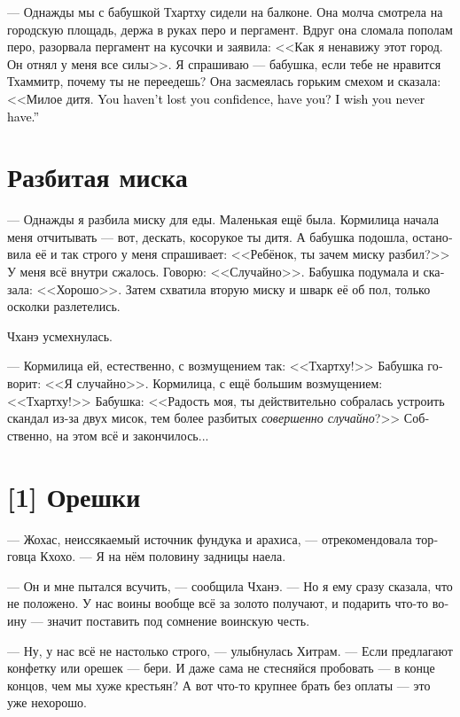 \documentclass[a4paper,12pt,fleqn]{book}\usepackage{cooltooltips}\usepackage{polyglossia}\setdefaultlanguage[babelshorthands=true]{russian}\setotherlanguage{english}\defaultfontfeatures{Ligatures=TeX,Mapping=tex-text} \usepackage{xcolor}\definecolor{lightgray}{HTML}{bbbbbb}\color{lightgray}\newcommand{\ml}[3]{\textenglish{\textcolor{black}{#3}}}
\begin{document}
{--- Однажды мы с бабушкой Тхартху сидели на балконе.
Она молча смотрела на городскую площадь, держа в руках перо и пергамент.
Вдруг она сломала пополам перо, разорвала пергамент на кусочки и заявила: <<Как я ненавижу этот город.
Он отнял у меня все силы>>.
Я спрашиваю --- бабушка, если тебе не нравится Тхаммитр, почему ты не переедешь?
Она засмеялась горьким смехом и сказала: <<Милое дитя.
\ml{$0$}
{Ты ещё по-настоящему не теряла веру в себя?}
{You haven't lost you confidence, have you?}
\ml{$0$}
{Надеюсь, тебе и не доведётся>>.}
{I wish you never have.''}

\section{Разбитая миска}

--- Однажды я разбила миску для еды.
Маленькая ещё была.
Кормилица начала меня отчитывать --- вот, дескать, косорукое ты дитя.
А бабушка подошла, остановила её и так строго у меня спрашивает: <<Ребёнок, ты зачем миску разбил?>>
У меня всё внутри сжалось.
Говорю: <<Случайно>>.
Бабушка подумала и сказала: <<Хорошо>>.
Затем схватила вторую миску и шварк её об пол, только осколки разлетелись.

Чханэ усмехнулась.

--- Кормилица ей, естественно, с возмущением так: <<Тхартху!>>
Бабушка говорит: <<Я случайно>>.
Кормилица, с ещё большим возмущением: <<Тхартху!>>
Бабушка: <<Радость моя, ты действительно собралась устроить скандал из-за двух мисок, тем более разбитых \textit{совершенно случайно}?>>
Собственно, на этом всё и закончилось...

\section{[1] Орешки}

--- Жохас, неиссякаемый источник фундука и арахиса, --- отрекомендовала торговца Кхохо.
--- Я на нём половину задницы наела.

--- Он и мне пытался всучить, --- сообщила Чханэ.
--- Но я ему сразу сказала, что не положено.
У нас воины вообще всё за золото получают, и подарить что-то воину --- значит поставить под сомнение воинскую честь.

--- Ну, у нас всё не настолько строго, --- улыбнулась Хитрам.
--- Если предлагают конфетку или орешек --- бери.
И даже сама не стесняйся пробовать --- в конце концов, чем мы хуже крестьян?
А вот что-то крупнее брать без оплаты --- это уже нехорошо.

}
\end{document}
